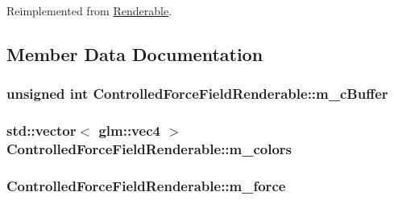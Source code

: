 Reimplemented from \hyperlink{classRenderable_a89d4bacd849c3606529f92c44b0a3bc1}{Renderable}.



\subsection{Member Data Documentation}
\hypertarget{classControlledForceFieldRenderable_a7494339c295c2b0b6550e34c89fbd9c1}{
\subsubsection[{m\+\_\+c\+Buffer}]{\setlength{\rightskip}{0pt plus 5cm}unsigned int Controlled\+Force\+Field\+Renderable\+::m\+\_\+c\+Buffer\hspace{0.3cm}{\ttfamily [private]}}}\label{classControlledForceFieldRenderable_a7494339c295c2b0b6550e34c89fbd9c1}
\hypertarget{classControlledForceFieldRenderable_a825c0d5323c7bc212b4b9325614a9414}{
\subsubsection[{m\+\_\+colors}]{\setlength{\rightskip}{0pt plus 5cm}std\+::vector$<$ glm\+::vec4 $>$ Controlled\+Force\+Field\+Renderable\+::m\+\_\+colors\hspace{0.3cm}{\ttfamily [private]}}}\label{classControlledForceFieldRenderable_a825c0d5323c7bc212b4b9325614a9414}
\hypertarget{classControlledForceFieldRenderable_a6832a057549138e1f7aea221677be189}{
\subsubsection[{m\+\_\+force}]{ Controlled\+Force\+Field\+Renderable\+::m\+\_\+force\hspace{0.3cm}{\ttfamily [private]}}}\label{classControlledForceFieldRenderable_a6832a057549138e1f7aea221677be189}
